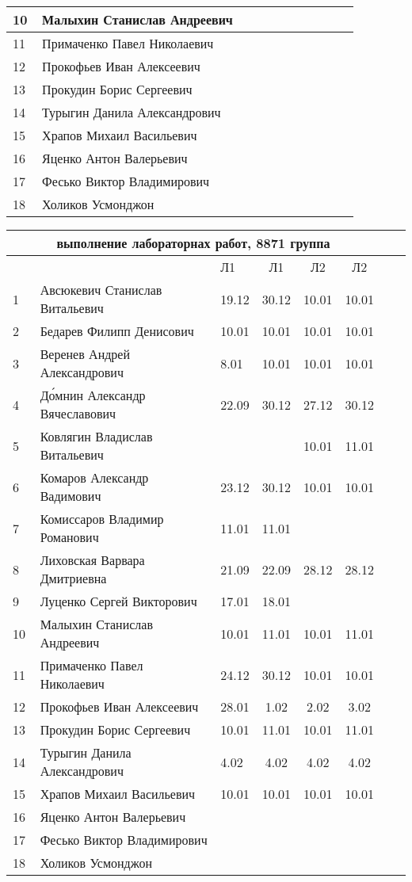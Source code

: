 \documentclass[a4paper,11pt]{article}
\newcommand*\ok{&{\small \ding{51}}} %
\newcommand*\no{&{\small }} %
\begin{document}
\begin{tabular}{p{7pt}|l|p{\CS}|p{\CS}|p{\CS}|p{\CS}|p{\CS}|p{\CS}|p{\CS}|p{\CS}|p{\CS}}
10\,&  Малыхин Станислав Андреевич      \no\no\no&&&&&\\
\midrule
11\,&  Примаченко Павел Николаевич      \no\ok\ok&&&&&\\
12\,&  Прокофьев Иван Алексеевич        \no\no\no&&&&&\\
13\,&  Прокудин Борис Сергеевич         \no\ok\ok&&&&&\\
14\,&  Турыгин Данила Александрович     \no\no\no&&&&\\
15\,&  Храпов Михаил Васильевич         \ok\ok\no&&&&\\
\midrule
16\,&  Яценко Антон Валерьевич          \no\ok\no&&&&&\\
17\,&  Фесько Виктор Владимирович       \no\no\no&&&&&\\
18\,&Холиков Усмонджон                  \no\no\ok&&&&&\\ 
\bottomrule
\end{tabular} 

\newpage
%
\begin{tabular}{l|llc|cccc}
\multicolumn{6}{c}{выполнение лабораторнах работ, 8871 группа} \\
\toprule
&&Л1&Л1& Л2&Л2\\
\midrule
1\,&  Авсюкевич Станислав Витальевич    &19.12& 30.12& 10.01& 10.01\\
2\,&  Бедарев Филипп Денисович          &10.01& 10.01& 10.01& 10.01\\
3\,&  Веренев Андрей Александрович      & 8.01& 10.01& 10.01& 10.01\\
4\,&  Д\'{о}мнин Александр Вячеславович &22.09& 30.12& 27.12& 30.12\\
5\,&   Ковлягин Владислав Витальевич    &     &      & 10.01& 11.01&\\
\midrule
6\,&  Комаров Александр Вадимович       &23.12& 30.12& 10.01& 10.01\\
7\,&  Комиссаров Владимир Романович     &11.01& 11.01&&\\
8\,&  Лиховская Варвара Дмитриевна      &21.09& 22.09& 28.12& 28.12\\
9\,&   Луценко Сергей Викторович        &17.01& 18.01&&\\
10\,&  Малыхин Станислав Андреевич      &10.01& 11.01& 10.01& 11.01\\
\midrule
11\,&  Примаченко Павел Николаевич      &24.12& 30.12& 10.01& 10.01\\
12\,&  Прокофьев Иван Алексеевич        &28.01&  1.02&  2.02&  3.02\\
13\,&  Прокудин Борис Сергеевич         &10.01& 11.01& 10.01& 11.01\\
14\,&  Турыгин Данила Александрович     & 4.02&  4.02&  4.02&  4.02\\
15\,&  Храпов Михаил Васильевич         &10.01& 10.01& 10.01& 10.01\\
\midrule
16\,&  Яценко Антон Валерьевич          &&&&\\
17\,&  Фесько Виктор Владимирович       &&&&\\
18\,&Холиков Усмонджон                  &&&&\\
\bottomrule
\end{tabular}
\end{document}
